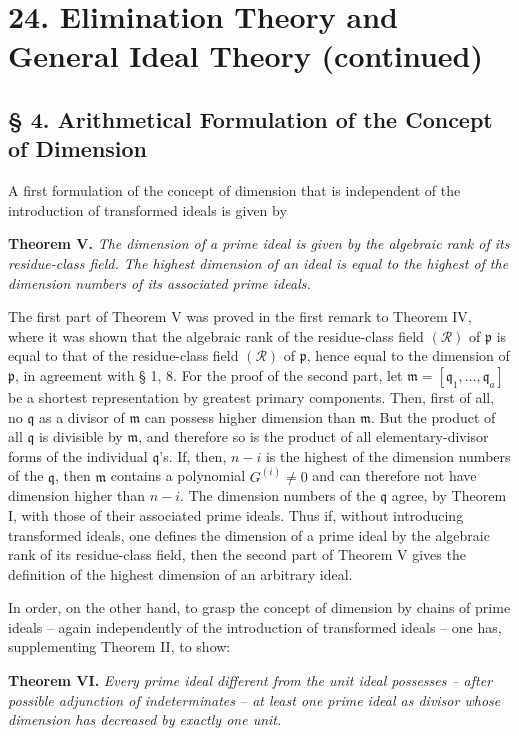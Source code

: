 \documentclass[11pt]{article}
\providecommand{\frakm}{\mathfrak m}
\providecommand{\frakp}{\mathfrak p}
\providecommand{\frakq}{\mathfrak q}
\begin{document}
\section*{24. Elimination Theory and General Ideal Theory (continued)}

\subsection*{§ 4. Arithmetical Formulation of the Concept of Dimension}

A first formulation of the concept of dimension that is independent of the introduction of transformed ideals is given by

\textbf{Theorem V.} \emph{The dimension of a prime ideal is given by the algebraic rank of its residue-class field. The highest dimension of an ideal is equal to the highest of the dimension numbers of its associated prime ideals.}

The first part of Theorem V was proved in the first remark to Theorem IV, where it was shown that the algebraic rank of the residue-class field $(\mathcal R)$ of $\frakp$ is equal to that of the residue-class field $(\mathcal R)$ of $\frakp$, hence equal to the dimension of $\frakp$, in agreement with § 1, 8. For the proof of the second part, let $\frakm=[\frakq_1,\ldots,\frakq_a]$ be a shortest representation by greatest primary components. Then, first of all, no $\frakq$ as a divisor of $\frakm$ can possess higher dimension than $\frakm$. But the product of all $\frakq$ is divisible by $\frakm$, and therefore so is the product of all elementary-divisor forms of the individual $\frakq$'s. If, then, $n-i$ is the highest of the dimension numbers of the $\frakq$, then $\frakm$ contains a polynomial $G^{(i)}\ne0$ and can therefore not have dimension higher than $n-i$. The dimension numbers of the $\frakq$ agree, by Theorem I, with those of their associated prime ideals. Thus if, without introducing transformed ideals, one defines the dimension of a prime ideal by the algebraic rank of its residue-class field, then the second part of Theorem V gives the definition of the highest dimension of an arbitrary ideal.

In order, on the other hand, to grasp the concept of dimension by chains of prime ideals -- again independently of the introduction of transformed ideals -- one has, supplementing Theorem II, to show:

\textbf{Theorem VI.} \emph{Every prime ideal different from the unit ideal possesses -- after possible adjunction of indeterminates -- at least one prime ideal as divisor whose dimension has decreased by exactly one unit.}
\end{document}

